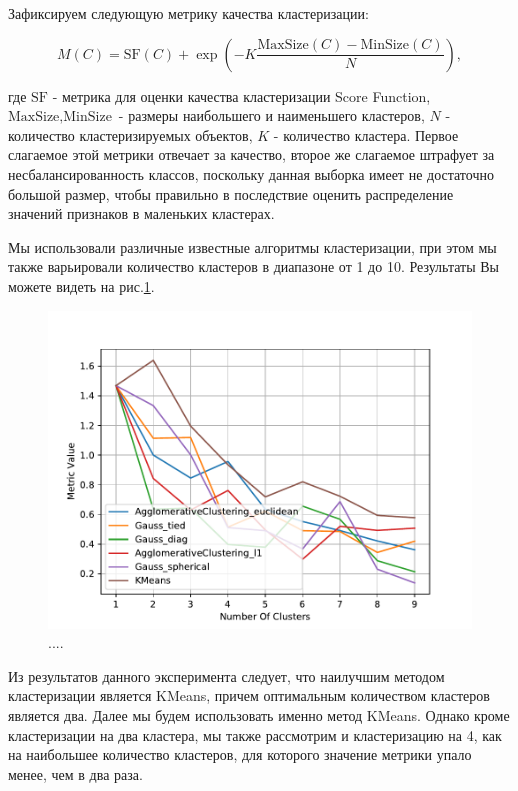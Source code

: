 \documentclass[12pt]{article}
\begin{document}
Зафиксируем следующую метрику качества кластеризации:

$$M(C) = \text{SF}(C) + \exp\left(-K\frac{\text{MaxSize}(C)-\text{MinSize}(C)}{N}\right),$$

где $\text{SF}$ - метрика для оценки качества кластеризации Score Function, $\text{MaxSize}, \text{MinSize}$ - размеры наибольшего и наименьшего кластеров, $N$ - количество кластеризируемых объектов, $K$ - количество кластера. Первое слагаемое этой метрики отвечает за качество, второе же слагаемое штрафует за несбалансированность классов, поскольку данная выборка имеет не достаточно большой размер, чтобы правильно в последствие оценить распределение значений признаков в маленьких кластерах.

Мы использовали различные известные алгоритмы кластеризации, при этом мы также варьировали количество кластеров в диапазоне от 1 до 10. Результаты Вы можете видеть на рис.\ref{choice}.

\begin{figure}[ht!]  
\centering \includegraphics[width=1\linewidth]{Images/clusters_number.pdf}

\caption{....} \label{choice}
\end{figure}

Из результатов данного эксперимента следует, что наилучшим методом кластеризации является KMeans, причем оптимальным количеством кластеров является два. Далее мы будем использовать именно метод KMeans. Однако кроме кластеризации на два кластера, мы также рассмотрим и кластеризацию на 4, как на наибольшее количество кластеров, для которого значение метрики упало менее, чем в два раза.
\end{document}
